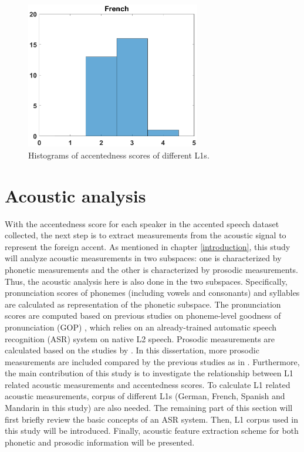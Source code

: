 \begin{figure}[h]
\begin{minipage}[t]{0.5\linewidth}
        \end{minipage}%
        \begin{minipage}[t]{0.5\linewidth}
        \centering
            \includegraphics[width=3in]{figures/French_hist.eps}
        \end{minipage}%
        \caption{Histograms of accentedness scores of different L1s.}
        \centering
        \label{fig0}
     \end{figure}

\section{Acoustic analysis}

With the accentedness score for each speaker in the accented speech dataset collected, the next step is to extract measurements from the acoustic signal to represent the foreign accent. As mentioned in chapter \ref{introduction}, this study will analyze acoustic measurements in two subspaces: one is characterized by phonetic measurements and the other is characterized by prosodic measurements. Thus, the acoustic analysis here is also done in the two subspaces. Specifically, pronunciation scores of phonemes (including vowels and consonants) and syllables are calculated as representation of the phonetic subspace. The pronunciation scores are computed based on previous studies on phoneme-level goodness of pronunciation (GOP) \citep{witt2000phone}, which relies on an already-trained automatic speech recognition (ASR) system on native L2 speech. Prosodic measurements are calculated based on the studies by \cite{ramus1999correlates,grabe2002durational}. In this dissertation, more prosodic measurements are included compared by the previous studies as in \citep{lai2013applying}. Furthermore, the main contribution of this study is to investigate the relationship between L1 related acoustic measurements and accentedness scores. To calculate L1 related acoustic measurements, corpus of different L1s (German, French, Spanish and Mandarin in this study) are also needed. The remaining part of this section will first briefly review the basic concepts of an ASR system. Then, L1 corpus used in this study will be introduced. Finally, acoustic feature extraction scheme for both phonetic and prosodic information will be presented.

